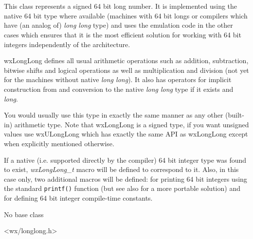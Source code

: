 
\section{}\label{wxlonglong}

This class represents a signed 64 bit long number. It is implemented using the
native 64 bit type where available (machines with 64 bit longs or compilers
which have (an analog of) {\it long long} type) and uses the emulation code in
the other cases which ensures that it is the most efficient solution for
working with 64 bit integers independently of the architecture.

wxLongLong defines all usual arithmetic operations such as addition,
subtraction, bitwise shifts and logical operations as well as multiplication
and division (not yet for the machines without native {\it long long}). It
also has operators for implicit construction from and conversion to the native 
{\it long long} type if it exists and {\it long}.

You would usually use this type in exactly the same manner as any other
(built-in) arithmetic type. Note that wxLongLong is a signed type, if you
want unsigned values use wxULongLong which has exactly the same API as
wxLongLong except when explicitly mentioned otherwise.

If a native (i.e. supported directly by the compiler) 64 bit integer type was
found to exist, {\it wxLongLong\_t} macro will be defined to correspond to it.
Also, in this case only, two additional macros will be defined: 
 for printing 64 bit integers
using the standard {\tt printf()} function (but see also 
 for a more portable solution) and
 for defining 64 bit integer compile-time constants.


No base class


<wx/longlong.h>

